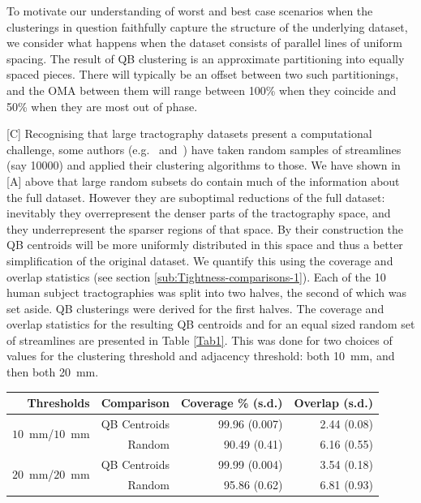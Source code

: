 \documentclass{bioinfo}
\begin{document}
To motivate our understanding of worst and best case scenarios when the
clusterings in question faithfully capture the structure of the
underlying dataset, we consider what happens when the dataset consists
of parallel lines of uniform spacing. The result of QB clustering is an
approximate partitioning into equally spaced pieces. There will
typically be an offset between two such partitionings, and the OMA between
them will range between 100\% when they coincide and 50\% when they are
most out of phase. 

[C] Recognising that large tractography datasets present a computational
challenge, some authors (e.g.~\citet{ODonnell_IEEETMI07}
and~\citet{Visser2010}) have taken random samples of streamlines (say
\num{10000}) and applied their clustering algorithms to those. We have
shown in [A] above that large random subsets do contain much of the
information about the full dataset. However they are suboptimal
reductions of the full dataset: inevitably they overrepresent the denser
parts of the tractography space, and they underrepresent the sparser
regions of that space. By their construction the QB centroids will be
more uniformly distributed in this space and thus a better simplification
of the original dataset. We quantify this using the coverage and overlap
statistics (see section \ref{sub:Tightness-comparisons-1}). Each of the 10 human
subject tractographies was split into two halves, the second of which was set
aside. QB clusterings were derived for the first halves. The coverage and
overlap statistics for the resulting QB centroids and for an equal sized
random set of streamlines are presented in Table \ref{Tab1}. This was
done for two choices of values for the clustering threshold and
adjacency threshold: both 10~mm, and then both 20~mm.


\begin{table}[th]
{\begin{tabular}{rrrr}
Thresholds & Comparison & Coverage \% (s.d.) & Overlap (s.d.) \\
\hline
\multirow{2}{*}{$10$~mm/$10$~mm} & QB Centroids & 99.96 (0.007) & 2.44 (0.08)\\   
& Random & 90.49 (0.41) & 6.16 (0.55)\\   
\hline
\multirow{2}{*}{$20$~mm/$20$~mm} & QB Centroids & 99.99 (0.004) & 3.54 (0.18)\\   
& Random & 95.86 (0.62) & 6.81 (0.93)\\   
\hline   
\end{tabular}}{}
\end{table}
\end{document}
